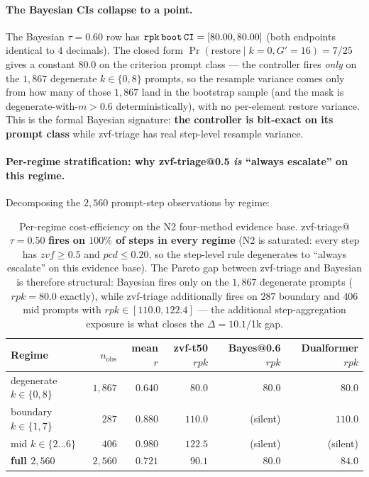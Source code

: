 \documentclass{article}
\begin{document}
\paragraph{The Bayesian CIs collapse to a point.}
The Bayesian $\tau{=}0.60$ row has $\texttt{rpk\,boot\,CI} = [80.00, 80.00]$
(both endpoints identical to $4$ decimals). The closed form
$\Pr(\mathrm{restore} \mid k{=}0, G'{=}16) = 7/25$ gives a constant
$80.0$ on the criterion prompt class --- the controller fires
\emph{only} on the $1{,}867$ degenerate $k \in \{0,8\}$ prompts,
so the resample variance comes only from how many of those
$1{,}867$ land in the bootstrap sample (and the mask is
degenerate-with-$m{>}0.6$ deterministically), with no per-element
restore variance. This is the formal Bayesian signature: \textbf{the
controller is bit-exact on its prompt class} while zvf-triage has
real step-level resample variance.

\paragraph{Per-regime stratification: why zvf-triage@0.5
\textit{is} ``always escalate'' on this regime.}
Decomposing the $2{,}560$ prompt-step observations by regime:

\begin{table}[t]
\centering
\caption{Per-regime cost-efficiency on the N2 four-method evidence
base. zvf-triage@$\tau{=}0.50$ \textbf{fires on $100\%$ of steps in
every regime} (N2 is saturated: every step has $zvf \geq 0.5$ and
$pcd \leq 0.20$, so the step-level rule degenerates to ``always
escalate'' on this evidence base). The Pareto gap between
zvf-triage and Bayesian is therefore structural: Bayesian fires
only on the $1{,}867$ degenerate prompts ($rpk{=}80.0$ exactly),
while zvf-triage additionally fires on $287$ boundary and $406$
mid prompts with $rpk \in [110.0, 122.4]$ --- the additional
step-aggregation exposure is what closes the $\Delta{=}10.1$/1k gap.}
\label{tab:p7-controller-regime}
\begin{tabular}{lrrrrr}
\toprule
Regime & $n_{\mathrm{obs}}$ & mean $r$ & zvf-t50 $rpk$ & Bayes@0.6 $rpk$ & Dualformer $rpk$ \\
\midrule
degenerate $k{\in}\{0,8\}$  & $1{,}867$ & $0.640$ & $80.0$ & $80.0$ & $80.0$ \\
boundary $k{\in}\{1,7\}$   & $287$ & $0.880$ & $110.0$ & (silent) & $110.0$ \\
mid $k{\in}\{2{\ldots}6\}$  & $406$ & $0.980$ & $122.5$ & (silent) & (silent) \\
\midrule
\textbf{full $2{,}560$} & $2{,}560$ & $0.721$ & $\mathbf{90.1}$ & $80.0$ & $84.0$ \\
\bottomrule
\end{tabular}
\end{table}
\end{document}
